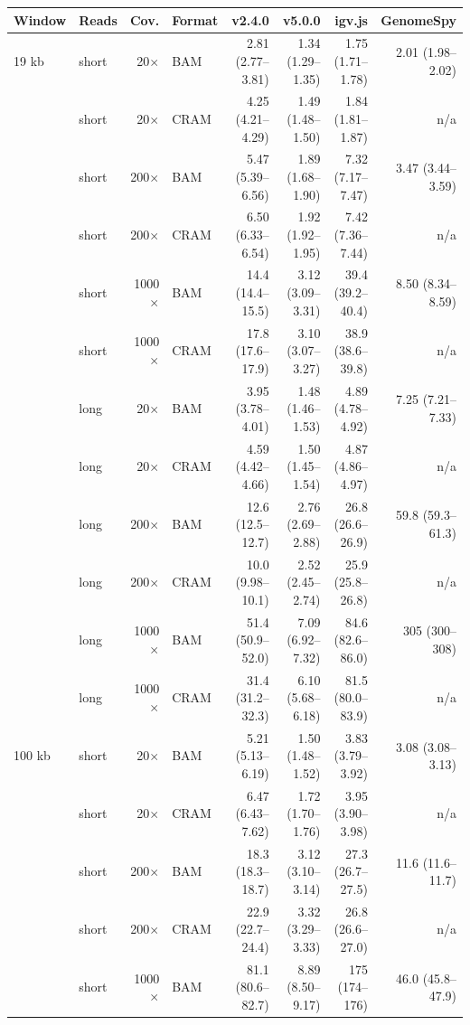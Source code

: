 \begin{tabular}{@{}llrlrrrr@{}}
\toprule
Window & Reads & Cov. & Format & v2.4.0 & v5.0.0 & igv.js & GenomeSpy \\
\midrule
19 kb & short & 20$\times$ & BAM & 2.81 (2.77--3.81) & 1.34 (1.29--1.35) & 1.75 (1.71--1.78) & 2.01 (1.98--2.02) \\
 & short & 20$\times$ & CRAM & 4.25 (4.21--4.29) & 1.49 (1.48--1.50) & 1.84 (1.81--1.87) & n/a \\
 & short & 200$\times$ & BAM & 5.47 (5.39--6.56) & 1.89 (1.68--1.90) & 7.32 (7.17--7.47) & 3.47 (3.44--3.59) \\
 & short & 200$\times$ & CRAM & 6.50 (6.33--6.54) & 1.92 (1.92--1.95) & 7.42 (7.36--7.44) & n/a \\
 & short & 1000$\times$ & BAM & 14.4 (14.4--15.5) & 3.12 (3.09--3.31) & 39.4 (39.2--40.4) & 8.50 (8.34--8.59) \\
 & short & 1000$\times$ & CRAM & 17.8 (17.6--17.9) & 3.10 (3.07--3.27) & 38.9 (38.6--39.8) & n/a \\
 & long & 20$\times$ & BAM & 3.95 (3.78--4.01) & 1.48 (1.46--1.53) & 4.89 (4.78--4.92) & 7.25 (7.21--7.33) \\
 & long & 20$\times$ & CRAM & 4.59 (4.42--4.66) & 1.50 (1.45--1.54) & 4.87 (4.86--4.97) & n/a \\
 & long & 200$\times$ & BAM & 12.6 (12.5--12.7) & 2.76 (2.69--2.88) & 26.8 (26.6--26.9) & 59.8 (59.3--61.3) \\
 & long & 200$\times$ & CRAM & 10.0 (9.98--10.1) & 2.52 (2.45--2.74) & 25.9 (25.8--26.8) & n/a \\
 & long & 1000$\times$ & BAM & 51.4 (50.9--52.0) & 7.09 (6.92--7.32) & 84.6 (82.6--86.0) & 305 (300--308) \\
 & long & 1000$\times$ & CRAM & 31.4 (31.2--32.3) & 6.10 (5.68--6.18) & 81.5 (80.0--83.9) & n/a \\
\midrule
100 kb & short & 20$\times$ & BAM & 5.21 (5.13--6.19) & 1.50 (1.48--1.52) & 3.83 (3.79--3.92) & 3.08 (3.08--3.13) \\
 & short & 20$\times$ & CRAM & 6.47 (6.43--7.62) & 1.72 (1.70--1.76) & 3.95 (3.90--3.98) & n/a \\
 & short & 200$\times$ & BAM & 18.3 (18.3--18.7) & 3.12 (3.10--3.14) & 27.3 (26.7--27.5) & 11.6 (11.6--11.7) \\
 & short & 200$\times$ & CRAM & 22.9 (22.7--24.4) & 3.32 (3.29--3.33) & 26.8 (26.6--27.0) & n/a \\
 & short & 1000$\times$ & BAM & 81.1 (80.6--82.7) & 8.89 (8.50--9.17) & 175 (174--176) & 46.0 (45.8--47.9) \\

\end{tabular}
